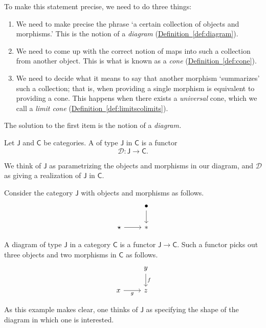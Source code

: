 \documentclass[main.tex]{subfiles}
\begin{document}
To make this statement precise, we need to do three things:
\begin{enumerate}
  \item We need to make precise the phrase `a certain collection of objects and morphisms.' This is the notion of a \emph{diagram} (\hyperref[def:diagram]{Definition~\ref*{def:diagram}}).

  \item We need to come up with the correct notion of maps into such a collection from another object. This is what is known as a \emph{cone} (\hyperref[def:cone]{Definition~\ref*{def:cone}}).

  \item We need to decide what it means to say that another morphism `summarizes' such a collection; that is, when providing a single morphism is equivalent to providing a cone. This happens when there exists a \emph{universal} cone, which we call a \emph{limit cone} (\hyperref[def:limitscolimits]{Definition~\ref*{def:limitscolimits}}).
\end{enumerate}

The solution to the first item is the notion of a \emph{diagram.}

\begin{definition}[diagram]
  \label{def:diagram}
  Let $\mathsf{J}$ and $\mathsf{C}$ be categories. A  of type $\mathsf{J}$ in $\mathsf{C}$ is a functor
  \begin{equation*}
    \mathcal{D}\colon \mathsf{J} \rightarrow \mathsf{C}.
  \end{equation*}
\end{definition}

We think of $\mathsf{J}$ as parametrizing the objects and morphisms in our diagram, and $\mathcal{D}$ as giving a realization of $\mathsf{J}$ in $\mathsf{C}$.

\begin{example}
  Consider the category $\mathsf{J}$ with objects and morphisms as follows.
  \begin{equation*}
    \begin{tikzcd}
      & \bullet
      \arrow[d]
      \\
      \star
      \arrow[r]
      & *
    \end{tikzcd}
  \end{equation*}

  A diagram of type $\mathsf{J}$ in a category $\mathsf{C}$ is a functor $\mathsf{J} \to \mathsf{C}$. Such a functor picks out three objects and two morphisms in $\mathsf{C}$ as follows.
  \begin{equation*}
    \begin{tikzcd}
      & y
      \arrow[d, "f"]
      \\
      x
      \arrow[r, swap, "g"]
      & z
    \end{tikzcd}
  \end{equation*}

  As this example makes clear, one thinks of $\mathsf{J}$ as specifying the shape of the diagram in which one is interested.
\end{example}
\end{document}
